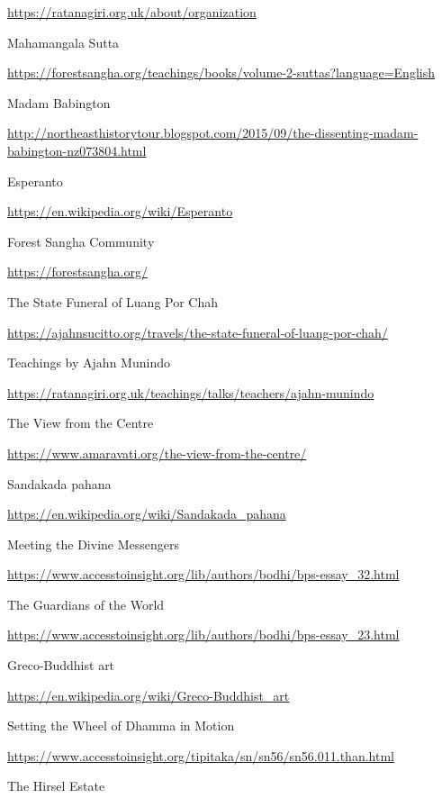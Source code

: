 \begin{thebibliography}{9}
  {\urlsize \url{https://ratanagiri.org.uk/about/organization}}

 Mahamangala Sutta

  {\urlsize \url{https://forestsangha.org/teachings/books/volume-2-suttas?language=English}}

 Madam Babington

  {\urlsize \url{http://northeasthistorytour.blogspot.com/2015/09/the-dissenting-madam-babington-nz073804.html}}

 Esperanto

  {\urlsize \url{https://en.wikipedia.org/wiki/Esperanto}}

 Forest Sangha Community

  {\urlsize \url{https://forestsangha.org/}}

 The State Funeral of Luang Por Chah

  {\urlsize \url{https://ajahnsucitto.org/travels/the-state-funeral-of-luang-por-chah/}}

 Teachings by Ajahn Munindo

  {\urlsize \url{https://ratanagiri.org.uk/teachings/talks/teachers/ajahn-munindo}}

 The View from the Centre

  {\urlsize \url{https://www.amaravati.org/the-view-from-the-centre/}}

 Sandakada pahana

  {\urlsize \url{https://en.wikipedia.org/wiki/Sandakada_pahana}}

 Meeting the Divine Messengers

  {\urlsize \url{https://www.accesstoinsight.org/lib/authors/bodhi/bps-essay_32.html}}

 The Guardians of the World

  {\urlsize \url{https://www.accesstoinsight.org/lib/authors/bodhi/bps-essay_23.html}}

 Greco-Buddhist art

  {\urlsize \url{https://en.wikipedia.org/wiki/Greco-Buddhist_art}}

 Setting the Wheel of Dhamma in Motion

  {\urlsize \url{https://www.accesstoinsight.org/tipitaka/sn/sn56/sn56.011.than.html}}

 The Hirsel Estate


\end{thebibliography}
